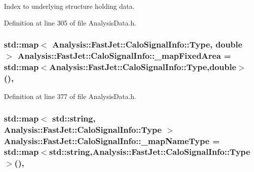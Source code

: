 Index to underlying structure holding data. 



Definition at line 305 of file Analysis\+Data.\+h.

\subsubsection[{\texorpdfstring{\+\_\+map\+Fixed\+Area}{_mapFixedArea}}]{\setlength{\rightskip}{0pt plus 5cm}std\+::map$<$ {\bf Analysis\+::\+Fast\+Jet\+::\+Calo\+Signal\+Info\+::\+Type}, double $>$ Analysis\+::\+Fast\+Jet\+::\+Calo\+Signal\+Info\+::\+\_\+map\+Fixed\+Area = std\+::map$<${\bf Analysis\+::\+Fast\+Jet\+::\+Calo\+Signal\+Info\+::\+Type},double$>$()\hspace{0.3cm}{\ttfamily [static]}, {\ttfamily [protected]}}\hypertarget{classAnalysis_1_1FastJet_1_1CaloSignalInfo_a239a18104bf9715d803b912b668fce21}{}\label{classAnalysis_1_1FastJet_1_1CaloSignalInfo_a239a18104bf9715d803b912b668fce21}


Definition at line 377 of file Analysis\+Data.\+h.

\subsubsection[{\texorpdfstring{\+\_\+map\+Name\+Type}{_mapNameType}}]{\setlength{\rightskip}{0pt plus 5cm}std\+::map$<$ std\+::string, {\bf Analysis\+::\+Fast\+Jet\+::\+Calo\+Signal\+Info\+::\+Type} $>$ Analysis\+::\+Fast\+Jet\+::\+Calo\+Signal\+Info\+::\+\_\+map\+Name\+Type = std\+::map$<$std\+::string,{\bf Analysis\+::\+Fast\+Jet\+::\+Calo\+Signal\+Info\+::\+Type}$>$()\hspace{0.3cm}{\ttfamily [static]}, {\ttfamily [protected]}}\hypertarget{classAnalysis_1_1FastJet_1_1CaloSignalInfo_abf6ff7b4cc2f83468d4c8e4ce19e9845}{}\label{classAnalysis_1_1FastJet_1_1CaloSignalInfo_abf6ff7b4cc2f83468d4c8e4ce19e9845}


